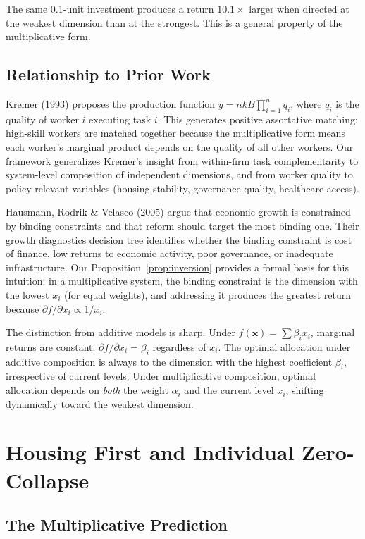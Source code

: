 \documentclass[12pt]{article}
\begin{document}
The same 0.1-unit investment produces a return $10.1\times$ larger when directed at the weakest dimension than at the strongest. This is a general property of the multiplicative form.

\subsection{Relationship to Prior Work}

Kremer (1993) proposes the production function $y = n k B \prod_{i=1}^{n} q_i$, where $q_i$ is the quality of worker $i$ executing task $i$. This generates positive assortative matching: high-skill workers are matched together because the multiplicative form means each worker's marginal product depends on the quality of all other workers. Our framework generalizes Kremer's insight from within-firm task complementarity to system-level composition of independent dimensions, and from worker quality to policy-relevant variables (housing stability, governance quality, healthcare access).

Hausmann, Rodrik \& Velasco (2005) argue that economic growth is constrained by binding constraints and that reform should target the most binding one. Their growth diagnostics decision tree identifies whether the binding constraint is cost of finance, low returns to economic activity, poor governance, or inadequate infrastructure. Our Proposition~\ref{prop:inversion} provides a formal basis for this intuition: in a multiplicative system, the binding constraint is the dimension with the lowest $x_i$ (for equal weights), and addressing it produces the greatest return because $\partial f / \partial x_i \propto 1/x_i$.

The distinction from additive models is sharp. Under $f(\mathbf{x}) = \sum \beta_i x_i$, marginal returns are constant: $\partial f / \partial x_i = \beta_i$ regardless of $x_i$. The optimal allocation under additive composition is always to the dimension with the highest coefficient $\beta_i$, irrespective of current levels. Under multiplicative composition, optimal allocation depends on \emph{both} the weight $\alpha_i$ and the current level $x_i$, shifting dynamically toward the weakest dimension.


\section{Housing First and Individual Zero-Collapse}
\label{sec:housing}

\subsection{The Multiplicative Prediction}
\end{document}
